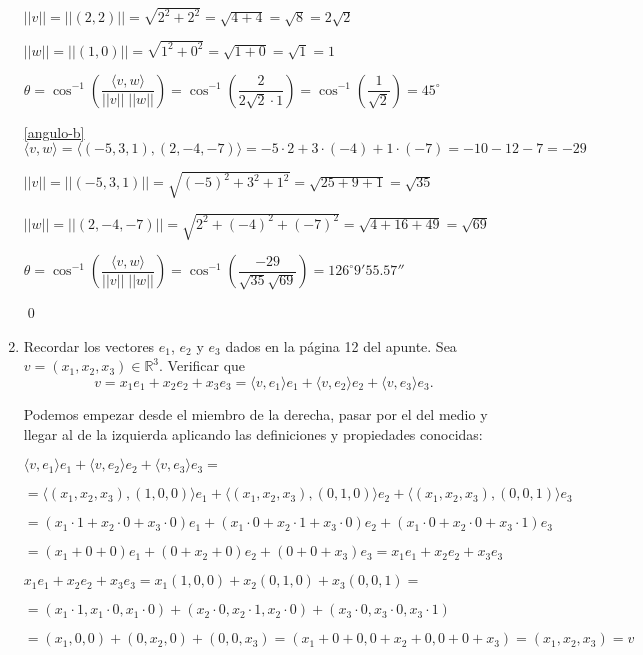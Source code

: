 \begin{enumerate}[topsep=6pt, itemsep=.4cm]
$||v||=||(2,2)|| = \sqrt{2^2 + 2^2} = \sqrt{4+4} = \sqrt{8} = 2 \sqrt{2}$

$||w||=||(1,0)|| = \sqrt{1^2 + 0 ^2} = \sqrt{1+0} = \sqrt{1} = 1 $

$\theta = \cos^{-1} \left( \dfrac{\langle v,w \rangle}{||v|| \; ||w||} \right) = \cos^{-1} \left( \dfrac{ 2 }{2\sqrt{2} \cdot 1 } \right) = \cos^{-1} \left( \dfrac{ 1 }{\sqrt{2}} \right) = \boxed{45^\circ}$

\noindent\ref{angulo-b} $\langle v , w  \rangle = \langle (-5,3,1) , (2,-4,-7)  \rangle = -5 \cdot 2 + 3 \cdot (-4) + 1 \cdot (-7) = -10 -12-7 = \boxed{-29}$

$||v||=||(-5,3,1)|| = \sqrt{(-5)^2 + 3^2 + 1^2} = \sqrt{25+9+1} = \sqrt{35}$

$||w||=||(2,-4,-7)|| = \sqrt{2^2 + (-4)^2 + (-7)^2} = \sqrt{4+16+49} = \sqrt{69}$

$\theta = \cos^{-1} \left( \dfrac{\langle v,w \rangle}{||v|| \; ||w||} \right) = \cos^{-1} \left( \dfrac{ -29 }{ \sqrt{35} \sqrt{69} } \right) = \boxed{126^\circ 9'55.57''}$

\qed

\item Recordar los vectores $e_1$, $e_2$ y $e_3$ dados en la página 12 del apunte. Sea $v=(x_1,x_2,x_3)\in\mathbb{R}^3$.  Verificar que 
$$v=x_1e_1+x_2e_2+x_3e_3=\langle v,e_1\rangle e_1+\langle v,e_2\rangle e_2+\langle v,e_3\rangle e_3.$$

\rta Podemos empezar desde el miembro de la derecha, pasar por el del medio y llegar al de la izquierda aplicando las definiciones y propiedades conocidas:

$ \langle v,e_1\rangle e_1+\langle v,e_2\rangle e_2+\langle v,e_3\rangle e_3 = $

$= \langle (x_1,x_2,x_3),(1,0,0)\rangle e_1+\langle (x_1,x_2,x_3),(0,1,0)\rangle e_2+\langle (x_1,x_2,x_3),(0,0,1)\rangle e_3 $

$= (x_1 \cdot 1 + x_2 \cdot 0 + x_3 \cdot 0) e_1+ (x_1 \cdot 0 + x_2 \cdot 1 + x_3 \cdot 0) e_2+ (x_1 \cdot 0 + x_2 \cdot 0 + x_3 \cdot 1) e_3 $

$= (x_1 + 0 + 0) e_1+ (0 + x_2 + 0) e_2+ (0 + 0 + x_3) e_3 = \boxed{x_1 e_1+ x_2 e_2 + x_3 e_3}$

$x_1 e_1+ x_2 e_2 + x_3 e_3 = x_1 (1,0,0) + x_2 (0,1,0) + x_3 (0,0,1) = $

$= (x_1 \cdot 1,x_1 \cdot 0,x_1 \cdot 0) + (x_2 \cdot 0, x_2 \cdot 1 , x_2 \cdot 0 ) + (x_3 \cdot 0 , x_3 \cdot 0 , x_3 \cdot 1) $

$= (x_1,0,0)+(0,x_2,0)+(0,0,x_3) = (x_1+0+0,0+x_2+0,0+0+x_3) = (x_1,x_2,x_3) = \boxed{v}$


\end{enumerate}
